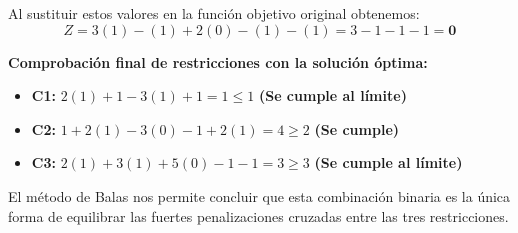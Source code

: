 \documentclass[10pt,a4paper]{article}
\begin{document}
Al sustituir estos valores en la función objetivo original obtenemos:
\[ Z = 3(1) - (1) + 2(0) - (1) - (1) = 3 - 1 - 1 - 1 = \mathbf{0} \]

\textbf{Comprobación final de restricciones con la solución óptima:}
\begin{itemize}
    \item \textbf{C1:} $2(1) + 1 - 3(1) + 1 = 1 \leq 1$ \textbf{(Se cumple al límite)}
    \item \textbf{C2:} $1 + 2(1) - 3(0) - 1 + 2(1) = 4 \geq 2$ \textbf{(Se cumple)}
    \item \textbf{C3:} $2(1) + 3(1) + 5(0) - 1 - 1 = 3 \geq 3$ \textbf{(Se cumple al límite)}
\end{itemize}

El método de Balas nos permite concluir que esta combinación binaria es la única forma de equilibrar las fuertes penalizaciones cruzadas entre las tres restricciones.
\end{document}
